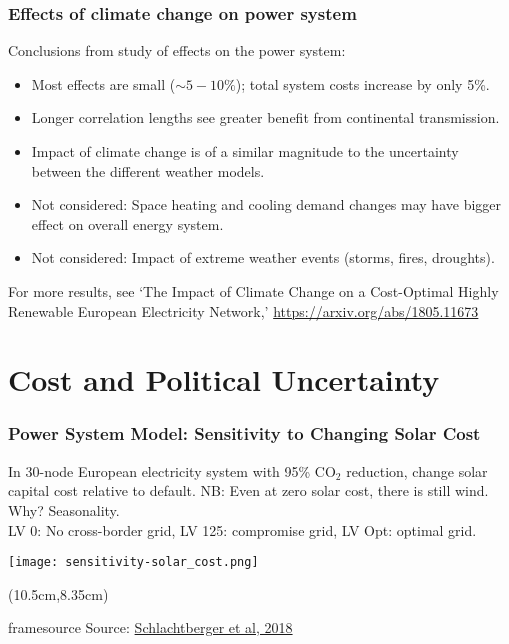 \documentclass[10pt,aspectratio=169,dvipsnames]{beamer}
\newcommand{\source}[1]{\begin{textblock*}{5cm}(10.5cm,8.35cm)
    \begin{beamercolorbox}[ht=0.5cm,right]{framesource}
        \usebeamerfont{framesource}\usebeamercolor[fg]{framesource} Source: {#1}
    \end{beamercolorbox}
\end{textblock*}}
\let\olditem\item
\renewcommand{\item}{%
\olditem\vspace{5pt}}
\begin{document}
\begin{frame}
  \frametitle{Effects of climate change on power system}

  Conclusions from study of effects on the power system:

    \begin{itemize}
    \item Most effects are small ($\sim 5-10\%$); total system costs increase by only 5\%.
     \item Longer correlation lengths see greater benefit from continental transmission.
     \item Impact of climate change is of a similar magnitude to the uncertainty between the different weather models.
       \item Not considered: Space heating and cooling demand changes may have bigger effect on overall energy system.
       \item Not considered: Impact of extreme weather events (storms, fires, droughts).
    \end{itemize}

    For more results, see `The Impact of Climate Change on a Cost-Optimal Highly Renewable European Electricity Network,' \url{https://arxiv.org/abs/1805.11673}

\end{frame}





\section{Cost and Political Uncertainty}

\begin{frame}
  \frametitle{Power System Model: Sensitivity to Changing Solar Cost}

  In 30-node European electricity system with 95\% CO$_2$ reduction, change solar
  capital cost relative to default. NB: Even at zero solar cost, there
  is still wind. Why? Seasonality.\\
  LV 0: No cross-border grid, LV 125: compromise grid, LV Opt: optimal grid.

\centering
    \texttt{[image: sensitivity-solar\_cost.png]}

    \source{\href{https://arxiv.org/abs/1803.09711}{Schlachtberger et al, 2018}}
\end{frame}
\end{document}
